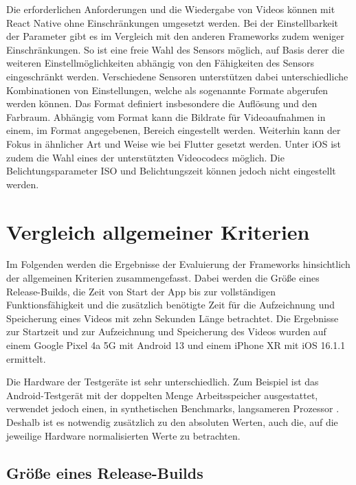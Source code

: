 Die erforderlichen Anforderungen und die Wiedergabe von Videos können mit React Native ohne Einschränkungen umgesetzt werden.
Bei der Einstellbarkeit der Parameter gibt es im Vergleich mit den anderen Frameworks zudem weniger Einschränkungen.
So ist eine freie Wahl des Sensors möglich, auf Basis derer die weiteren Einstellmöglichkeiten abhängig von den Fähigkeiten des Sensors eingeschränkt werden.
Verschiedene Sensoren unterstützen dabei unterschiedliche Kombinationen von Einstellungen, welche als sogenannte Formate abgerufen werden können.
Das Format definiert insbesondere die Auflösung und den Farbraum.
Abhängig vom Format kann die Bildrate für Videoaufnahmen in einem, im Format angegebenen, Bereich eingestellt werden.
Weiterhin kann der Fokus in ähnlicher Art und Weise wie bei Flutter gesetzt werden.
Unter iOS ist zudem die Wahl eines der unterstützten Videocodecs möglich.
Die Belichtungsparameter ISO und Belichtungszeit können jedoch nicht eingestellt werden.


\section{Vergleich allgemeiner Kriterien}
\label{sec:evaluation_allgemein}

Im Folgenden werden die Ergebnisse der Evaluierung der Frameworks hinsichtlich der allgemeinen Kriterien zusammengefasst.
Dabei werden die Größe eines Release-Builds, die Zeit von Start der App bis zur vollständigen Funktionsfähigkeit und die zusätzlich benötigte Zeit für die Aufzeichnung und Speicherung eines Videos mit zehn Sekunden Länge betrachtet.
Die Ergebnisse zur Startzeit und zur Aufzeichnung und Speicherung des Videos wurden auf einem Google Pixel 4a 5G mit Android 13 und einem iPhone XR mit iOS 16.1.1 ermittelt. 

Die Hardware der Testgeräte ist sehr unterschiedlich.
Zum Beispiel ist das Android-Testgerät mit der doppelten Menge Arbeitsspeicher ausgestattet, verwendet jedoch einen, in synthetischen Benchmarks, langsameren Prozessor \cite{Comparison_Phones}.
Deshalb ist es notwendig zusätzlich zu den absoluten Werten, auch die, auf die jeweilige Hardware normalisierten Werte zu betrachten.


\subsection{Größe eines Release-Builds}

